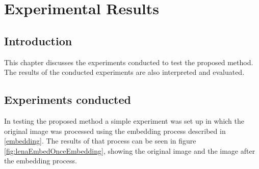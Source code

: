 \documentclass[12pt]{article}
\begin{document}
\section{Experimental Results} 
\subsection{Introduction}
This chapter discusses the experiments conducted to test the proposed method. 
The results of the conducted experiments are also interpreted and evaluated. 

\subsection{Experiments conducted}
\label{experimentsConducted}
In testing the proposed method a simple experiment was set up in which the original image was processed using the embedding process described in \ref{embedding}.
The results of that process can be seen in figure \ref{fig:lenaEmbedOnceEmbedding}, showing the original image and the image after the embedding process.
\end{document}
